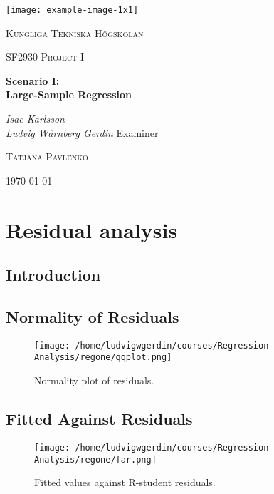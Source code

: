 \documentclass[11pt]{article}
\author{Ludde}
\date{\today}
\title{}
\begin{document}
\begin{titlepage}
\centering
\texttt{[image: example-image-1x1]}\par\vspace{1cm}
{\scshape\LARGE Kungliga Tekniska Högskolan \par}
\vspace{1cm}
{\scshape\Large SF2930 Project I \par}
\vspace{1.5cm}
{\huge\bfseries Scenario I: \\ Large-Sample Regression \par}
\vspace{2cm}
{\Large\itshape Isac Karlsson \\ Ludvig Wärnberg Gerdin}
\vfill
Examiner \par
\textsc{Tatjana Pavlenko}

\vfill

{\large \today\par}
\end{titlepage}

\newpage
\tableofcontents
\newpage
\section{Residual analysis}
\label{sec:org8d7d2da}
\subsection{Introduction}
\label{sec:org399f122}
\subsection{Normality of Residuals}
\label{sec:orgde58591}

\begin{figure}[htbp]
\centering
\texttt{[image: /home/ludvigwgerdin/courses/Regression Analysis/regone/qqplot.png]}
\caption{\label{fig:org682c2bb}
Normality plot of residuals.}
\end{figure}

\subsection{Fitted Against Residuals}
\label{sec:org0860431}

\begin{figure}[htbp]
\centering
\texttt{[image: /home/ludvigwgerdin/courses/Regression Analysis/regone/far.png]}
\caption{\label{fig:org04893f9}
Fitted values against R-student residuals.}
\end{figure}
\end{document}
